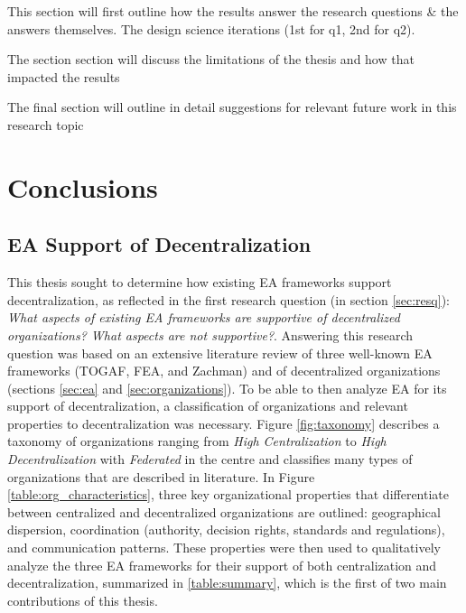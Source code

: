 This section will first outline how the results answer the research questions \& the answers themselves. The design science iterations (1st for q1, 2nd for q2).



The section section will discuss the limitations of the thesis and how that impacted the results


The final section will outline in detail suggestions for relevant future work in this research topic 



\section{Conclusions}
\label{sec:conclusions}

\subsection{EA Support of Decentralization}

This thesis sought to determine how existing EA frameworks support decentralization, as reflected in the first research question (in section \ref{sec:resq}): \textit{What aspects of existing EA frameworks are supportive of decentralized organizations? What aspects are not supportive?}. Answering this research question was based on an extensive literature review of three well-known EA frameworks (TOGAF, FEA, and Zachman) and of decentralized organizations (sections \ref{sec:ea} and \ref{sec:organizations}). To be able to then analyze EA for its support of decentralization, a classification of organizations and relevant properties to decentralization was necessary. Figure \ref{fig:taxonomy} describes a taxonomy of organizations ranging from \textit{High Centralization} to \textit{High Decentralization} with \textit{Federated} in the centre and classifies many types of organizations that are described in literature. In Figure \ref{table:org_characteristics}, three key organizational properties that differentiate between centralized and decentralized organizations are outlined: geographical dispersion, coordination (authority, decision rights, standards and regulations), and communication patterns. These properties were then used to qualitatively analyze the three EA frameworks for their support of both centralization and decentralization, summarized in \ref{table:summary}, which is the first of two main contributions of this thesis.

